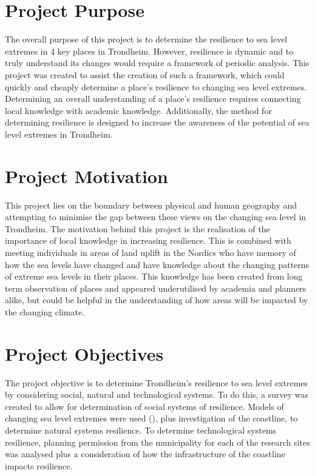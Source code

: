 \paragraph{}

\section{Project Purpose}
The overall purpose of this project is to determine the resilience to sea level extremes in 4 key places in Trondheim. However, resilience is dynamic and to truly understand its changes would require a framework of periodic analysis. This project was created to assist the creation of such a framework, which could quickly and cheaply determine a place's resilience to changing sea level extremes. Determining an overall understanding of a place's resilience requires connecting local knowledge with academic knowledge. Additionally, the method for determining resilience is designed to increase the awareness of the potential of sea level extremes in Trondheim. 

\section{Project Motivation}
 This project lies on the boundary between physical and human geography and attempting to minimise the gap between these views on the changing sea level in Trondheim. The motivation behind this project is the realisation of the importance of local knowledge in increasing resilience. This is combined with meeting individuals in areas of land uplift in the Nordics who have memory of how the sea levels have changed and have knowledge about the changing patterns of extreme sea levels in their places. This knowledge has been created from long term observation of places and appeared underutilised by academia and planners alike, but could be helpful in the understanding of how areas will be impacted by the changing climate. 

\section{Project Objectives}
The project objective is to determine Trondheim's resilience to sea level extremes by considering social, natural and technological systems. To do this, a survey was created to allow for determination of social systems of resilience.  Models of changing sea level extremes were used (\cite{kartverket_se_2020}), plus investigation of the coastline, to determine natural systems resilience. To determine technological systems resilience, planning permission from the municipality for each of the research sites was analysed plus a consideration of how the infrastructure of the coastline impacts resilience.

